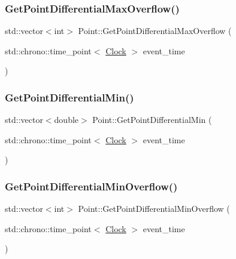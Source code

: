 \mbox{\label{classPoint_a2d38599722fbf65afe2b9ac57b0c4bcf}} 
\subsubsection{\texorpdfstring{Get\+Point\+Differential\+Max\+Overflow()}{GetPointDifferentialMaxOverflow()}}
{\footnotesize\ttfamily std\+::vector$<$int$>$ Point\+::\+Get\+Point\+Differential\+Max\+Overflow (\begin{DoxyParamCaption}\item[{std\+::chrono\+::time\+\_\+point$<$ \mbox{\hyperlink{universe_8h_a0ef8d951d1ca5ab3cfaf7ab4c7a6fd80}{Clock}} $>$}]{event\+\_\+time }\end{DoxyParamCaption})\hspace{0.3cm}{\ttfamily [inline]}}

\mbox{\label{classPoint_a782860849006b601600f8df15af23f7a}} 
\subsubsection{\texorpdfstring{Get\+Point\+Differential\+Min()}{GetPointDifferentialMin()}}
{\footnotesize\ttfamily std\+::vector$<$double$>$ Point\+::\+Get\+Point\+Differential\+Min (\begin{DoxyParamCaption}\item[{std\+::chrono\+::time\+\_\+point$<$ \mbox{\hyperlink{universe_8h_a0ef8d951d1ca5ab3cfaf7ab4c7a6fd80}{Clock}} $>$}]{event\+\_\+time }\end{DoxyParamCaption})\hspace{0.3cm}{\ttfamily [inline]}}

\mbox{\label{classPoint_adbc225afbd532763617db1acdb81ef4c}} 
\subsubsection{\texorpdfstring{Get\+Point\+Differential\+Min\+Overflow()}{GetPointDifferentialMinOverflow()}}
{\footnotesize\ttfamily std\+::vector$<$int$>$ Point\+::\+Get\+Point\+Differential\+Min\+Overflow (\begin{DoxyParamCaption}\item[{std\+::chrono\+::time\+\_\+point$<$ \mbox{\hyperlink{universe_8h_a0ef8d951d1ca5ab3cfaf7ab4c7a6fd80}{Clock}} $>$}]{event\+\_\+time }\end{DoxyParamCaption})\hspace{0.3cm}{\ttfamily [inline]}}

